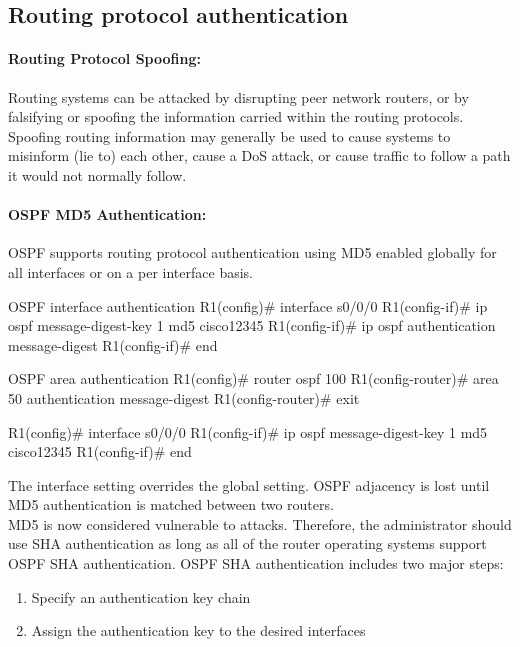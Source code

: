 \subsection{Routing protocol authentication}

\paragraph{Routing Protocol Spoofing:} Routing systems can be attacked by disrupting peer network routers, or by falsifying or spoofing the information carried within the routing protocols. Spoofing routing information may generally be used to cause systems to misinform (lie to) each other, cause a DoS attack, or cause traffic to follow a path it would not normally follow. 

\paragraph{OSPF MD5 Authentication:} OSPF supports routing protocol authentication using MD5  enabled globally for all interfaces or on a per interface basis.

\begin{sexylisting}{OSPF interface authentication}
R1(config)# interface s0/0/0
R1(config-if)# ip ospf message-digest-key 1 md5 cisco12345
R1(config-if)# ip ospf authentication message-digest
R1(config-if)# end
\end{sexylisting}

\begin{sexylisting}{OSPF area authentication}
R1(config)# router ospf 100
R1(config-router)# area 50 authentication message-digest
R1(config-router)# exit

R1(config)# interface s0/0/0
R1(config-if)# ip ospf message-digest-key 1 md5 cisco12345
R1(config-if)# end
\end{sexylisting}

\note The interface setting overrides the global setting. OSPF adjacency is lost until MD5 authentication is matched between two routers.\\

MD5 is now considered vulnerable to attacks. Therefore, the administrator should use SHA authentication as long as all of the router operating systems support OSPF SHA authentication. OSPF SHA authentication includes two major steps:

\begin{enumerate}
\item Specify an authentication key chain
\item Assign the authentication key to the desired interfaces 
\end{enumerate}

